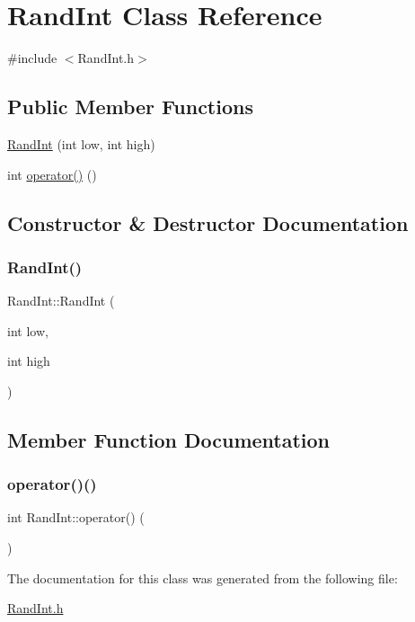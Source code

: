 \hypertarget{class_rand_int}{}\section{Rand\+Int Class Reference}
\label{class_rand_int}


{\ttfamily \#include $<$Rand\+Int.\+h$>$}

\subsection*{Public Member Functions}
\begin{DoxyCompactItemize}
\item 
\mbox{\hyperlink{class_rand_int_a65769f660fbe5ed7fc2269a63624c821}{Rand\+Int}} (int low, int high)
\item 
int \mbox{\hyperlink{class_rand_int_a56a5c4ac80fe8abc2ec5b0b35e203ede}{operator()}} ()
\end{DoxyCompactItemize}


\subsection{Constructor \& Destructor Documentation}
\mbox{\label{class_rand_int_a65769f660fbe5ed7fc2269a63624c821}} 
\subsubsection{\texorpdfstring{RandInt()}{RandInt()}}
{\footnotesize\ttfamily Rand\+Int\+::\+Rand\+Int (\begin{DoxyParamCaption}\item[{int}]{low,  }\item[{int}]{high }\end{DoxyParamCaption})\hspace{0.3cm}{\ttfamily [inline]}}



\subsection{Member Function Documentation}
\mbox{\label{class_rand_int_a56a5c4ac80fe8abc2ec5b0b35e203ede}} 
\subsubsection{\texorpdfstring{operator()()}{operator()()}}
{\footnotesize\ttfamily int Rand\+Int\+::operator() (\begin{DoxyParamCaption}{ }\end{DoxyParamCaption})\hspace{0.3cm}{\ttfamily [inline]}}



The documentation for this class was generated from the following file\+:\begin{DoxyCompactItemize}
\item 
\mbox{\hyperlink{_rand_int_8h}{Rand\+Int.\+h}}\end{DoxyCompactItemize}
